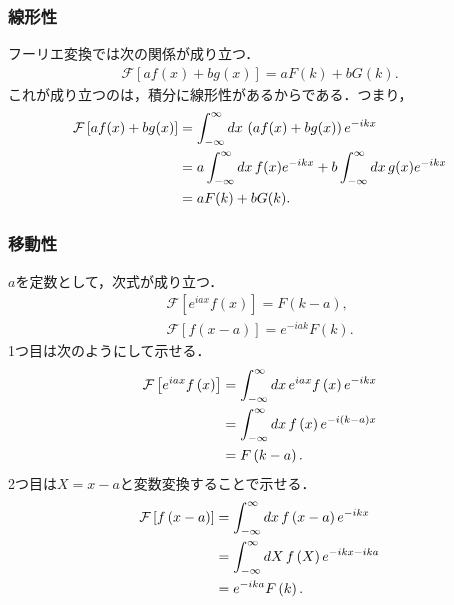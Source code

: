 \subsubsection{線形性}
フーリエ変換では次の関係が成り立つ．
\begin{align}
 \mathcal{F}\left[af\left(x\right) + bg\left(x\right)\right] = aF\left(k\right) + bG\left(k\right).
\end{align}
これが成り立つのは，積分に線形性があるからである．つまり，
\begin{align}
 \mathcal{F}\left[af(x) + b g(x)\right] 
   &= \int_{-\infty}^{\infty}dx\,\left(af(x)+bg(x)\right)e^{-ikx} \notag \\
   &= a\int_{-\infty}^{\infty}dx\,f(x)e^{-ikx} + b\int_{-\infty}^{\infty}dx\,g(x)e^{-ikx} \notag \\
   &= aF(k) + bG(k).
\end{align}
%
%
\subsubsection{移動性}
%
$a$を定数として，次式が成り立つ．
%
\begin{align}
 \mathcal{F}\left[e^{iax}f\left(x\right)\right] = F\left(k-a\right), \\
 \mathcal{F}\left[f\left(x-a\right)\right]      = e^{-iak}F\left(k\right). 
\end{align}
%
1つ目は次のようにして示せる．
\begin{align}
 \mathcal{F}\left[e^{iax}f\left(x\right)\right] 
 &=\int_{-\infty}^{\infty}dx\,e^{iax}f\left(x\right)e^{-ikx} \notag \\
 &=\int_{-\infty}^{\infty}dx\,f\left(x\right)e^{-i\left(k-a\right)x} \notag \\
 &=F\left(k-a\right). 
\end{align}
2つ目は$X=x-a$と変数変換することで示せる．
\begin{align}
 \mathcal{F}\left[f\left(x-a\right)\right]      
 &= \int_{-\infty}^{\infty}dx\,f\left(x-a\right)e^{-ikx} \notag \\
 &= \int_{-\infty}^{\infty}dX\,f\left(X\right)e^{-ikx-ika} \notag \\
 &= e^{-ika}F\left(k\right).
\end{align}
%
